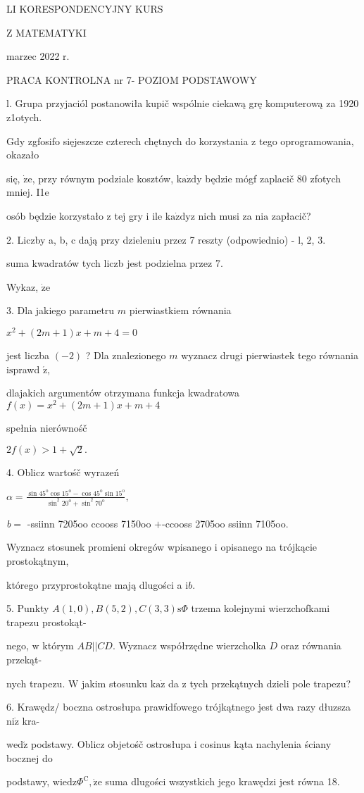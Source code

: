 \documentclass[a4paper,12pt]{article}
\begin{document}
LI KORESPONDENCYJNY KURS

Z MATEMATYKI

marzec 2022 r.

PRACA KONTROLNA nr 7- POZIOM PODSTAWOWY

l. Grupa przyjaciól postanowiła kupič wspólnie ciekawą grę komputerową za 1920 z1otych.

Gdy zgfosifo sięjeszcze czterech chętnych do korzystania $\mathrm{z}$ tego oprogramowania, okazało

się, $\dot{\mathrm{z}}\mathrm{e}$, przy równym podziale kosztów, $\mathrm{k}\mathrm{a}\dot{\mathrm{z}}\mathrm{d}\mathrm{y}$ będzie mógf zaplacič 80 zfotych mniej. I1e

osób będzie korzystało $\mathrm{z}$ tej gry $\mathrm{i}$ ile $\mathrm{k}\mathrm{a}\dot{\mathrm{z}}\mathrm{d}\mathrm{y}\mathrm{z}$ nich musi za $\mathrm{n}\mathrm{i}\mathrm{a}$ zapłacič?

2. Liczby a, b, c dają przy dzieleniu przez 7 reszty (odpowiednio) - l, 2, 3.

suma kwadratów tych liczb jest podzielna przez 7.

Wykaz, $\dot{\mathrm{z}}\mathrm{e}$

3. Dla jakiego parametru $m$ pierwiastkiem równania

$x^{2}+(2m+1)x+m+4=0$

jest liczba $(-2)$ ? Dla znalezionego $m$ wyznacz drugi pierwiastek tego równania $\mathrm{i}\mathrm{s}$prawd $\acute{\mathrm{z}},$

dlajakich argumentów otrzymana funkcja kwadratowa $f(x)=x^{2}+(2m+1)x+m+4$

spełnia nierównośč

$2f(x)>1+\sqrt{2}.$

4. Oblicz wartośč wyrazeń

$\displaystyle \alpha=\frac{\sin 45^{\mathrm{o}}\cos 15^{\mathrm{o}}-\cos 45^{\mathrm{o}}\sin 15^{\mathrm{o}}}{\sin^{2}20^{\mathrm{o}}+\sin^{2}70^{\mathrm{o}}},$

{\it b}$=$ -ssiinn 7205oo ccooss 7150oo $+$-ccooss 2705oo ssiinn 7105oo.

Wyznacz stosunek promieni okregów wpisanego $\mathrm{i}$ opisanego na trójkącie prostokątnym,

którego przyprostokątne mają dlugości a $\mathrm{i}b.$

5. Punkty $A(1,0), B(5,2), C(3,3) \mathrm{s}\Phi$ trzema kolejnymi wierzchofkami trapezu prostokąt-

nego, $\mathrm{w}$ którym $AB||CD$. Wyznacz współrzędne wierzcholka $D$ oraz równania przekąt-

nych trapezu. $\mathrm{W}$ jakim stosunku $\mathrm{k}\mathrm{a}\dot{\mathrm{z}}$ da $\mathrm{z}$ tych przekątnych dzieli pole trapezu?

6. Krawędz/ boczna ostrosłupa prawidfowego trójkątnego jest dwa razy dłuzsza $\mathrm{n}\mathrm{i}\dot{\mathrm{z}}$ kra-

$\mathrm{w}\mathrm{e}\mathrm{d}\acute{\mathrm{z}}$ podstawy. Oblicz objetośč ostrosłupa $\mathrm{i}$ cosinus kąta nachylenia ściany bocznej do

podstawy, $\mathrm{w}\mathrm{i}\mathrm{e}\mathrm{d}\mathrm{z}\Phi^{\mathrm{C}}, \dot{\mathrm{z}}\mathrm{e}$ suma dlugości wszystkich jego krawędzi jest równa 18.
\end{document}
